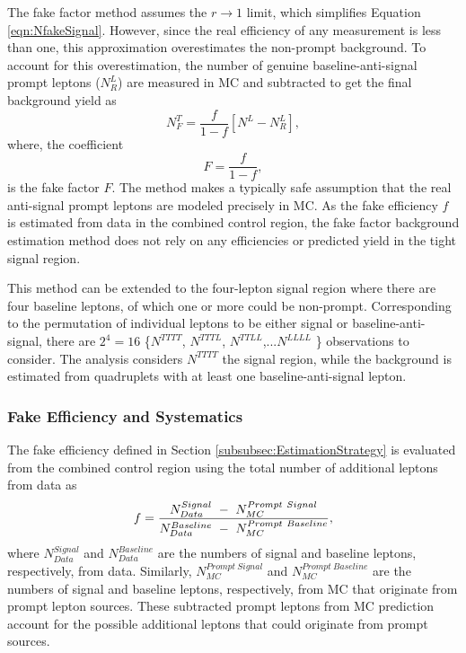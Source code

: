 The fake factor method assumes the $r\rightarrow 1$ limit, which simplifies Equation \ref{eqn:NfakeSignal}. However, since the real efficiency of any measurement is less than one, this approximation overestimates the non-prompt background. To account for this overestimation, the number of genuine baseline-anti-signal prompt leptons ($N^{L}_{R}$) are measured in MC and subtracted to get the final background yield as 
\begin{equation}
    N_{F}^{T} =  \frac{f}{1-f}[N^{L}-N^{L}_{R}],
\label{eqn:NfakeSignalFinal}
\end{equation}
where, the coefficient \begin{equation} F=\frac{f}{1-f}, \label{eqn:FakeFactor}
\end{equation} is the fake factor $F$. The method makes a typically safe assumption that the real anti-signal prompt leptons are modeled precisely in MC. As the fake efficiency $f$ is estimated from data in the combined control region, the fake factor background estimation method does not rely on any efficiencies or predicted yield in the tight signal region.

This method can be extended to the four-lepton signal region where there are four baseline leptons, of which one or more could be non-prompt. Corresponding to the permutation of individual leptons to be either signal or baseline-anti-signal, there are $2^{4}=16$ \{$N^{TTTT}$, $N^{TTTL}$, $N^{TTLL}$,...$N^{LLLL}$ \} observations to consider. The analysis considers $N^{TTTT}$ the signal region, while the background is estimated from quadruplets with at least one baseline-anti-signal lepton.

\subsubsection{Fake Efficiency and Systematics}
\label{subsubsec:FakeEff}
The fake efficiency defined in Section \ref{subsubsec:EstimationStrategy} is evaluated from the combined control region using the total number of additional leptons from data as
\begin{equation}{\label{eq:fakeff}}
\begin{aligned}
f = \frac{ N_{Data}^{Signal}~-~N_{MC}^{Prompt~Signal}}{ N_{Data}^{Baseline}~-~N_{MC}^{Prompt~Baseline}},
\end{aligned}
\end{equation}
where $N_{Data}^{Signal}$ and $N_{Data}^{Baseline}$ are the numbers of signal and baseline leptons, respectively, from data. Similarly, $N_{MC}^{Prompt~Signal}$ and $N_{MC}^{Prompt~Baseline}$ are the numbers of signal and baseline leptons, respectively, from MC that originate from prompt lepton sources. These subtracted prompt leptons from MC prediction account for the possible additional leptons that could originate from prompt sources.

